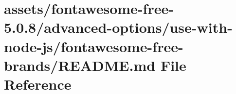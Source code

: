 \hypertarget{fontawesome-free-5_80_88_2advanced-options_2use-with-node-js_2fontawesome-free-brands_2_r_e_a_d_m_e_8md}{}\section{assets/fontawesome-\/free-\/5.0.8/advanced-\/options/use-\/with-\/node-\/js/fontawesome-\/free-\/brands/\+R\+E\+A\+D\+ME.md File Reference}
\label{fontawesome-free-5_80_88_2advanced-options_2use-with-node-js_2fontawesome-free-brands_2_r_e_a_d_m_e_8md}
